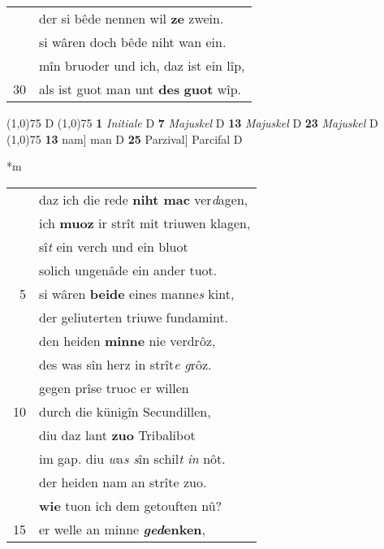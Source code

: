 \documentclass[8pt,a4paper,notitlepage]{article}
\begin{document}
\begin{table}[ht]
\begin{minipage}[t]{0.5\linewidth}
\begin{tabular}{rl}
 & der si bêde nennen wil \textbf{ze} zwein.\\ 
 & si wâren doch bêde niht wan ein.\\ 
 & mîn bruoder und ich, daz ist ein lîp,\\ 
30 & als ist guot man unt \textbf{des} \textbf{guot} wîp.\\ 
\end{tabular}
\scriptsize
\line(1,0){75} \newline
D \newline
\line(1,0){75} \newline
\textbf{1} \textit{Initiale} D  \textbf{7} \textit{Majuskel} D  \textbf{13} \textit{Majuskel} D  \textbf{23} \textit{Majuskel} D  \newline
\line(1,0){75} \newline
\textbf{13} nam] man D \textbf{25} Parzival] Parcifal D \newline
\end{minipage}
\hspace{0.5cm}
\begin{minipage}[t]{0.5\linewidth}
\small
\begin{center}*m
\end{center}
\begin{tabular}{rl}
 & daz ich die rede \textbf{niht mac} ver\textit{d}agen,\\ 
 & ich \textbf{muoz} ir strît mit triuwen klagen,\\ 
 & sî\textit{t} ein verch und ein bluot\\ 
 & solich ungenâde ein ander tuot.\\ 
5 & si wâren \textbf{beide} eines manne\textit{s} kint,\\ 
 & der geliuterten triuwe fundamint.\\ 
 & den heiden \textbf{minne} nie verdrôz,\\ 
 & des was sîn herz in strît\textit{e g}rôz.\\ 
 & gegen prîse truoc er willen\\ 
10 & durch die künigîn Secundillen,\\ 
 & diu daz lant \textbf{zuo} Tribalibot\\ 
 & im gap. diu \textit{w}a\textit{s s}în schil\textit{t} \textit{in} nôt.\\ 
 & der heiden nam an strîte zuo.\\ 
 & \textbf{wie} tuon ich dem getouften nû?\\ 
15 & er welle an minne \textbf{\textit{ged}enken},\\ 

\end{tabular}
\end{minipage}
\end{table}
\end{document}
